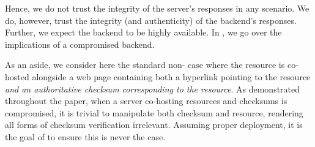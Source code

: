 Hence, we do not trust the integrity of the server's responses in any scenario.
We do, however, trust the integrity (and authenticity) of the backend's
responses. Further, we expect the backend to be highly available. In
, we go over the implications of a compromised backend.

As an aside, we consider here the standard non-\SYSTEM{} case where the resource
is co-hosted alongside a web page containing both a hyperlink pointing to the
resource \emph{and an authoritative checksum corresponding to the resource}. As
demonstrated throughout the paper, when a server co-hosting resources and
checksums is compromised, it is trivial to manipulate both checksum and
resource, rendering all forms of checksum verification irrelevant. Assuming
proper deployment, it is the goal of \SYSTEM{} to ensure this is never the case.
